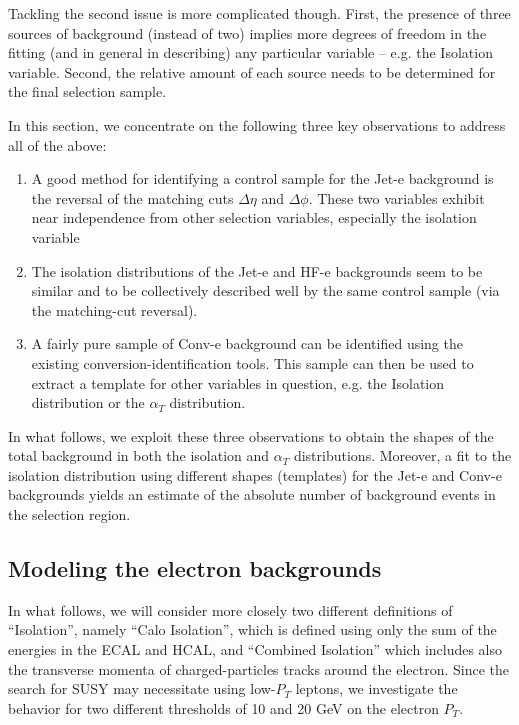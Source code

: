 Tackling the second issue is more complicated though. First, the presence of three sources of background (instead of two) implies more degrees of freedom in the fitting (and in general in describing) any particular variable -- e.g. the Isolation variable. Second, the relative amount of each source needs to be determined for the final selection sample.

In this section, we concentrate on the following three key observations to address all of the above:
\begin{enumerate}
\item A good method for identifying a control sample for the Jet-e background is the reversal of the matching cuts $\Delta\eta$ and $\Delta\phi$.  These two variables exhibit near independence from other selection variables, especially the isolation variable
\item The isolation distributions of the Jet-e and HF-e backgrounds seem to be similar and to be collectively described well by the same control sample (via the matching-cut reversal).
\item A fairly pure sample of Conv-e background can be identified using the existing conversion-identification tools. This sample can then be used to extract a template for other variables in question, e.g. the Isolation distribution or the $\alpha_T$ distribution.
\end{enumerate}
In what follows, we exploit these three observations to obtain the shapes of the total background in both the isolation and $\alpha_T$ distributions.  Moreover, a fit to the isolation distribution using different shapes (templates) for the Jet-e and Conv-e backgrounds yields an estimate of the absolute number of background events in the selection region.

\subsection{Modeling the electron backgrounds}
\label{sec:modeling}

In what follows, we will consider more closely two different definitions of ``Isolation'', namely ``Calo Isolation'', which is defined using only the sum of the energies in the ECAL and HCAL, and ``Combined Isolation'' which includes also the transverse momenta of charged-particles tracks around the electron.  Since the search for SUSY may necessitate using low-$P_T$ leptons, we investigate the behavior for two different thresholds of 10 and 20 GeV on the electron $P_T$.

